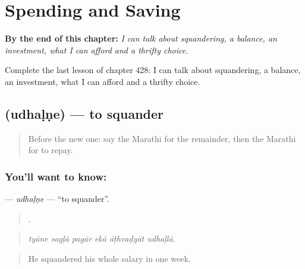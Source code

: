 
\chapter{Spending and Saving}
\label{ch:mr-spending-and-saving}

\begin{chapteropening}
\textbf{By the end of this chapter:} \emph{I can talk about squandering, a balance, an investment, what I can afford and a thrifty choice.}

Complete the last lesson of chapter 428: I can talk about squandering, a balance, an investment, what I can afford and a thrifty choice.
\end{chapteropening}

\section[\texorpdfstring{\mr{उधळणे} (udhaḷṇe)}{उधळणे (udhaḷṇe)}]{ (udhaḷṇe) — to squander}

\label{lesson:MR-C428-udhalne}



\begin{quote}
Before the new one: say the Marathi for the remainder, then the Marathi for to repay.
\end{quote}

\subsection*{You'll want to know: }
\textbf{} — \emph{udhaḷṇe} — \textquotedblleft{}to squander\textquotedblright{}.

\begin{quote}
     .
\end{quote}

\begin{quote}
\emph{tyāne sagḷā pagār ekā āṭhvaḍyāt udhaḷlā.}
\end{quote}

\begin{quote}
He squandered his whole salary in one week.
\end{quote}

